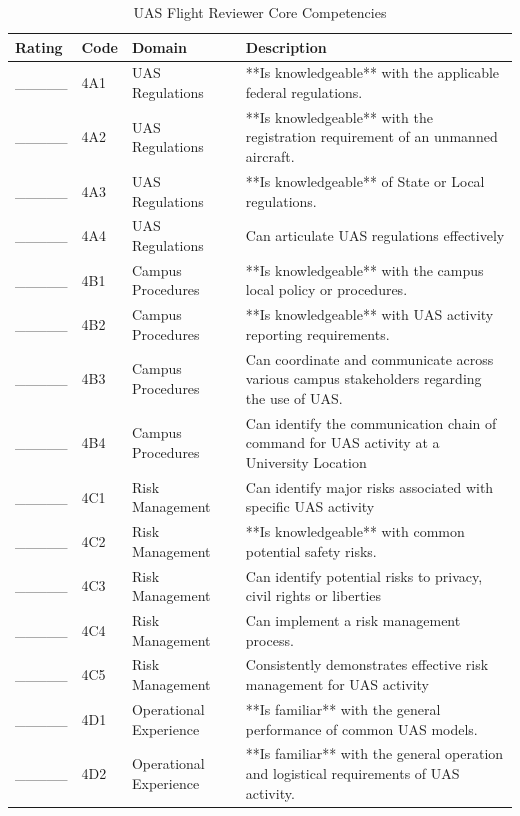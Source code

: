 \documentclass[
]{book}
\begin{document}
\begin{longtable}[t]{lll>{\raggedright\arraybackslash}p{25em}}
\caption{\label{tab:unnamed-chunk-13}UAS Flight Reviewer Core Competencies}\\
\toprule
Rating & Code & Domain & Description\\
\midrule
\_\_\_\_\_ & 4A1 & UAS Regulations & **Is knowledgeable** with the applicable federal regulations.\\
\_\_\_\_\_ & 4A2 & UAS Regulations & **Is knowledgeable** with the registration requirement of an unmanned aircraft.\\
\_\_\_\_\_ & 4A3 & UAS Regulations & **Is knowledgeable** of State or Local regulations.\\
\_\_\_\_\_ & 4A4 & UAS Regulations & Can articulate UAS regulations effectively\\
\_\_\_\_\_ & 4B1 & Campus Procedures & **Is knowledgeable** with the campus local policy or procedures.\\
\addlinespace
\_\_\_\_\_ & 4B2 & Campus Procedures & **Is knowledgeable** with UAS activity reporting requirements.\\
\_\_\_\_\_ & 4B3 & Campus Procedures & Can coordinate and communicate across various campus stakeholders regarding the use of UAS.\\
\_\_\_\_\_ & 4B4 & Campus Procedures & Can identify the communication chain of command for UAS activity at a University Location\\
\_\_\_\_\_ & 4C1 & Risk Management & Can identify major risks associated with specific UAS activity\\
\_\_\_\_\_ & 4C2 & Risk Management & **Is knowledgeable** with common potential safety risks.\\
\addlinespace
\_\_\_\_\_ & 4C3 & Risk Management & Can identify potential risks to privacy, civil rights or liberties\\
\_\_\_\_\_ & 4C4 & Risk Management & Can implement a risk management process.\\
\_\_\_\_\_ & 4C5 & Risk Management & Consistently demonstrates effective risk management for UAS activity\\
\_\_\_\_\_ & 4D1 & Operational Experience & **Is familiar** with the general performance of common UAS models.\\
\_\_\_\_\_ & 4D2 & Operational Experience & **Is familiar** with the general operation and logistical requirements of UAS activity.\\
\bottomrule
\end{longtable}
\end{document}
